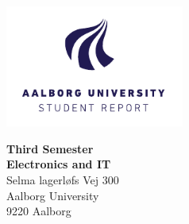 

{}
\thispagestyle{empty}

\begin{minipage}[t]{0.48\textwidth}
\vspace*{-25pt}			%
\includegraphics[height=4cm]{billeder/AAU-logo-stud-UK-RGB.pdf}
\end{minipage}
\hfill
\begin{minipage}[t]{0.48\textwidth}
{\small 
\textbf{Third Semester}\\
\textbf{Electronics and IT}  \\
Selma lagerløfs Vej 300 \\
Aalborg University \\
9220 Aalborg \\
}
\end{minipage}

\vspace*{1cm}

